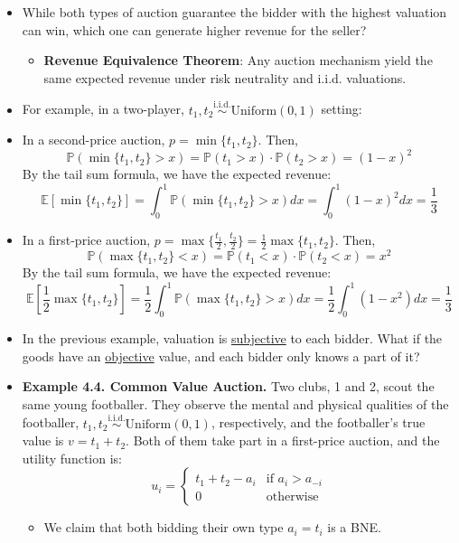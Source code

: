 \documentclass[notitlepage]{article}
\begin{document}
\begin{itemize}
    \item While both types of auction guarantee the bidder with the highest valuation can win, which one can generate higher revenue for the seller?
    \begin{itemize}
        \item \textbf{Revenue Equivalence Theorem}: Any auction mechanism yield the same expected revenue under risk neutrality and i.i.d. valuations.
    \end{itemize}
    \item For example, in a two-player, \(t_1, t_2 \overset{\mathrm{i.i.d.}}{\sim}\text{Uniform}(0,1)\) setting:
    \item In a second-price auction, \(p=\min\{t_1,t_2\}\). Then, 
    \[
    \mathbb{P}(\min\{t_1,t_2\}>x) = \mathbb{P}(t_1 > x) \cdot \mathbb{P}(t_2 > x) = (1-x)^2
    \]
    By the tail sum formula, we have the expected revenue:
    \[
    \mathbb{E}[\min\{t_1,t_2\}] = \int_0^1\mathbb{P}(\min\{t_1,t_2\}>x)dx = \int_0^1(1-x)^2dx = \frac{1}{3}
    \]
    \item In a first-price auction, \(p = \max\{\frac{t_1}{2},\frac{t_2}{2}\} = \frac{1}{2}\max\{t_1,t_2\}\). Then,
    \[
    \mathbb{P}(\max\{t_1,t_2\}<x) = \mathbb{P}(t_1 < x) \cdot \mathbb{P}(t_2 < x) = x^2
    \]
    By the tail sum formula, we have the expected revenue:
    \[
    \mathbb{E}[\frac{1}{2}\max\{t_1,t_2\}] = \frac{1}{2}\int_0^1\mathbb{P}(\max\{t_1,t_2\}>x)dx = \frac{1}{2}\int_0^1 (1-x^2) dx = \frac{1}{3}
    \]
    \item In the previous example, valuation is \underline{subjective} to each bidder. What if the goods have an \underline{objective} value, and each bidder only knows a part of it?
    \item \textbf{Example 4.4. Common Value Auction.} Two clubs, 1 and 2, scout the same young footballer. They observe the mental and physical qualities of the footballer, \(t_1, t_2 \overset{\mathrm{i.i.d.}}{\sim}\text{Uniform}(0,1)\), respectively, and the footballer's true value is \(v=t_1+t_2\). Both of them take part in a first-price auction, and the utility function is:
    \[
    u_i =
    \begin{cases}
        t_1 + t_2 - a_i & \text{if } a_i > a_{-i} \\
        0 & \text{otherwise}
    \end{cases}
    \]
    \begin{itemize}
        \item We claim that both bidding their own type \(a_i = t_i\) is a BNE.

\end{itemize}
\end{itemize}
\end{document}
